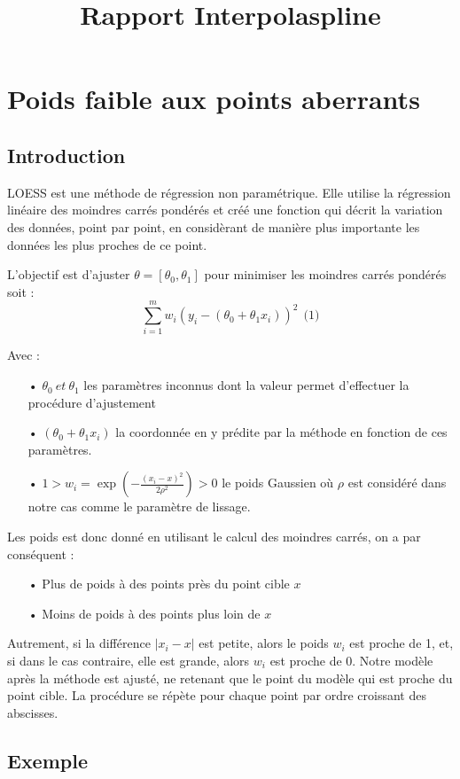 \documentclass[a4paper,12pt]{article} %
\title{Rapport Interpolaspline}
\begin{document}
\section{Poids faible aux points aberrants}

\subsection{Introduction}

LOESS est une méthode de régression non paramétrique. Elle utilise la régression linéaire des moindres carrés pondérés et créé une fonction qui décrit la variation des données, point par point, en considèrant de manière plus importante les données les plus proches de ce point.

L'objectif est d'ajuster $\theta = [\theta_0, \theta_1]$ pour minimiser les moindres carrés pondérés soit : \[\sum_{i=1}^m w_i ( y_i - (\theta_0 + \theta_1 x_i))^2 \ \ \text{(1)}\]

Avec : 
\begin{itemize}
    \item[•]  $\theta_0 \ et \ \theta_1$ les paramètres inconnus dont la valeur permet d'effectuer la procédure d'ajustement  
    \item[•]  $(\theta_0 + \theta_1 x_i)$ la coordonnée en y prédite par la méthode en fonction de ces paramètres.
    \item[•]  $1 > w_i = \exp \left( - \frac{(x_i - x)^2}{2 \rho^2} \right) > 0$ le poids Gaussien où  $\rho$ est considéré dans notre cas comme le paramètre de lissage.
\end{itemize}

Les poids est donc donné en utilisant le calcul des moindres carrés, on a par conséquent :
\begin{itemize}
    \item[•] Plus de poids à des points près du point cible $x$ 
    \item[•] Moins de poids à des points plus loin de $x$
\end{itemize}
Autrement, si la différence $| x_i - x |$ est petite, alors le poids $w_i$ est proche de 1, et, si dans le cas contraire, elle est grande, alors $w_i$ est proche de 0. 
Notre modèle après la méthode est ajusté, ne retenant que le point du modèle qui est proche du point cible. La procédure se répète pour chaque point par ordre croissant des abscisses.


\subsection{Exemple}
\end{document}

